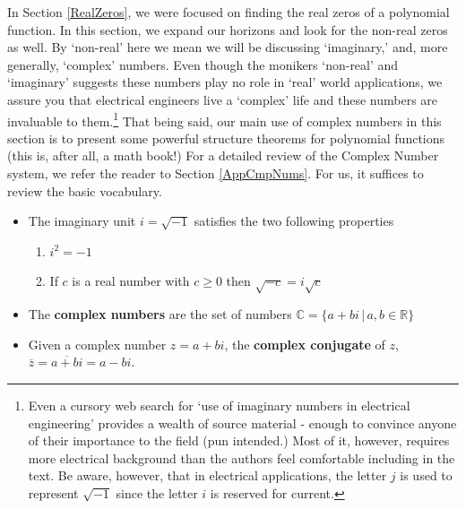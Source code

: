 \documentclass{ximera}
\begin{document}
	\author{Stitz-Zeager}




\setcounter{footnote}{0}

\label{ComplexZeros}

In Section \ref{RealZeros}, we were focused on finding the real zeros of a polynomial function.  In this section, we expand our horizons and look for the non-real zeros as well. By `non-real' here we mean we will be discussing `imaginary,' and, more generally, `complex' numbers.  Even though the monikers `non-real' and `imaginary' suggests these numbers play no role in `real' world applications, we assure you that electrical engineers live a `complex' life and these numbers are invaluable to them.\footnote{Even a cursory web search for `use of imaginary numbers in electrical engineering' provides a wealth of source material - enough to convince anyone of their importance to the field (pun intended.)  Most of it, however, requires more electrical background than the authors feel comfortable including in the text.  Be aware, however, that in electrical applications, the letter $j$ is used to represent $\sqrt{-1}$ since the letter $i$ is reserved for current.}  That being said, our main use of complex numbers in this section is to present some powerful structure theorems for polynomial functions (this is, after all, a math book!)  For a detailed review of the Complex Number system, we refer the reader to Section \ref{AppCmpNums}.  For us, it suffices to review the basic vocabulary.  


\begin{itemize}
 
\item The imaginary unit $i = \sqrt{-1}$ satisfies the two following properties

\begin{enumerate}

\item  $i^2 = -1$

\item  If $c$ is a real number with $c \geq 0$ then $\sqrt{-c} = i \sqrt{c}$

\end{enumerate}

\item The \textbf{complex numbers} are the set of numbers $\mathbb{C} = \{ a + bi \, | \, a, b \in \mathbb{R} \}$

\item  Given a complex number $z = a+bi$, the \textbf{complex conjugate} of $z$, $\overline{z}  = \overline{a+bi} = a - bi$.

\end{itemize}
\end{document}

